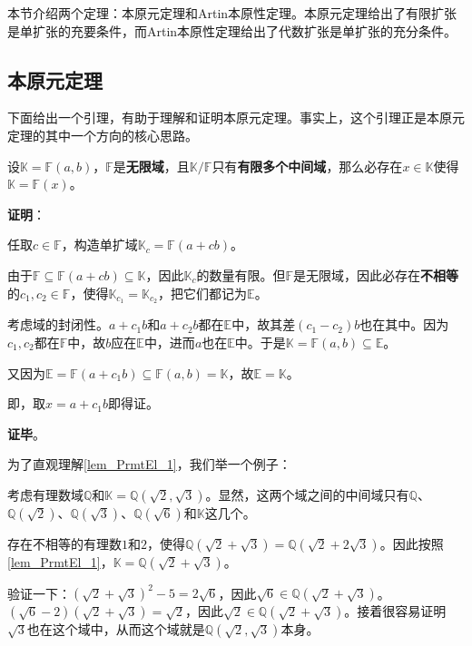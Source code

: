 


本节介绍两个定理：本原元定理和Artin本原性定理。本原元定理给出了有限扩张是单扩张的充要条件，而Artin本原性定理给出了代数扩张是单扩张的充分条件。

\subsection{本原元定理}

下面给出一个引理，有助于理解和证明本原元定理。事实上，这个引理正是本原元定理的其中一个方向的核心思路。


\begin{lemma}{}\label{lem_PrmtEl_1}
设$\mathbb{K}=\mathbb{F}(a, b)$，$\mathbb{F}$是\textbf{无限域}，且$\mathbb{K}/\mathbb{F}$只有\textbf{有限多个中间域}，那么必存在$x\in\mathbb{K}$使得$\mathbb{K}=\mathbb{F}(x)$。
\end{lemma}

\textbf{证明}：

任取$c\in\mathbb{F}$，构造单扩域$\mathbb{K}_c=\mathbb{F}(a+cb)$。

由于$\mathbb{F}\subseteq\mathbb{F}(a+cb)\subseteq\mathbb{K}$，因此$\mathbb{K}_c$的数量有限。但$\mathbb{F}$是无限域，因此必存在\textbf{不相等}的$c_1, c_2\in\mathbb{F}$，使得$\mathbb{K}_{c_1}=\mathbb{K}_{c_2}$，把它们都记为$\mathbb{E}$。

考虑域的封闭性。$a+c_1b$和$a+c_2b$都在$\mathbb{E}$中，故其差$(c_1-c_2)b$也在其中。因为$c_1, c_2$都在$\mathbb{F}$中，故$b$应在$\mathbb{E}$中，进而$a$也在$\mathbb{E}$中。于是$\mathbb{K}=\mathbb{F}(a, b)\subseteq\mathbb{E}$。

又因为$\mathbb{E}=\mathbb{F}(a+c_1b)\subseteq\mathbb{F}(a, b)=\mathbb{K}$，故$\mathbb{E}=\mathbb{K}$。

即，取$x=a+c_1b$即得证。

\textbf{证毕}。


为了直观理解\autoref{lem_PrmtEl_1}，我们举一个例子：

\begin{example}{}

考虑有理数域$\mathbb{Q}$和$\mathbb{K}=\mathbb{Q}(\sqrt{2}, \sqrt{3})$。显然，这两个域之间的中间域只有$\mathbb{Q}$、$\mathbb{Q}(\sqrt{2})$、$\mathbb{Q}(\sqrt{3})$、$\mathbb{Q}(\sqrt{6})$和$\mathbb{K}$这几个。

存在不相等的有理数$1$和$2$，使得$\mathbb{Q}(\sqrt{2}+\sqrt{3})=\mathbb{Q}(\sqrt{2}+2\sqrt{3})$。因此按照\autoref{lem_PrmtEl_1}，$\mathbb{K}=\mathbb{Q}(\sqrt{2}+\sqrt{3})$。

验证一下：$(\sqrt{2}+\sqrt{3})^2-5=2\sqrt{6}$，因此$\sqrt{6}\in\mathbb{Q}(\sqrt{2}+\sqrt{3})$。$(\sqrt{6}-2)(\sqrt{2}+\sqrt{3})=\sqrt{2}$，因此$\sqrt{2}\in\mathbb{Q}(\sqrt{2}+\sqrt{3})$。接着很容易证明$\sqrt{3}$也在这个域中，从而这个域就是$\mathbb{Q}(\sqrt{2}, \sqrt{3})$本身。

\end{example}



